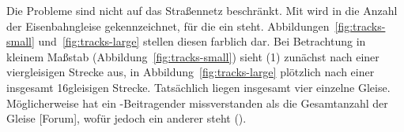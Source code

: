 \documentclass[../main/thesis.tex]{subfiles}
\begin{document}


\label{railway-case}

Die Probleme sind nicht auf das Straßennetz beschränkt. Mit  wird in \osm{} die Anzahl der Eisenbahngleise gekennzeichnet, für die ein  steht. Abbildungen~\ref{fig:tracks-small} und~\ref{fig:tracks-large} stellen diesen  farblich dar. Bei Betrachtung in kleinem Maßstab (Abbildung~\ref{fig:tracks-small}) sieht (1) zunächst nach einer viergleisigen Strecke aus, in Abbildung~\ref{fig:tracks-large} plötzlich nach einer insgesamt 16gleisigen Strecke. Tatsächlich liegen insgesamt vier einzelne Gleise. Möglicherweise hat ein \osm-Beitragender  missverstanden als die Gesamtanzahl der Gleise [Forum], wofür jedoch ein anderer  steht ().
\end{document}
